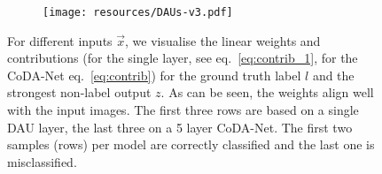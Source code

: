 \begin{figure}[t!]
    \centering
    \hspace{-.25em}
    \begin{subfigure}[b]{0.48\textwidth}
    \texttt{[image: resources/DAUs-v3.pdf]}
     \end{subfigure}
    \caption{\small
        For different inputs $\vec x$, we visualise the linear weights and contributions (for the single layer, see eq.~\eqref{eq:contrib_1}, for the CoDA-Net eq.~\eqref{eq:contrib}) for the ground truth label $l$ and the strongest non-label output $z$. 
    As can be seen, the weights align well with the input images.
    The first three rows are based on a single DAU layer, the last three on a 5 layer CoDA-Net. The first two samples (rows) per model are correctly classified and the last one is misclassified. }
    \label{fig:alignment}
\end{figure}